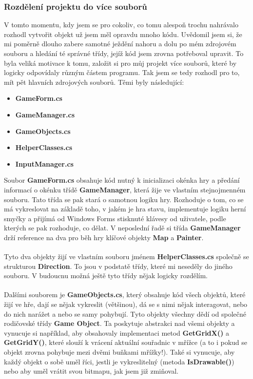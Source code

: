 \documentclass[a4]{article}
\begin{document}
\subsubsection{Rozdělení projektu do více souborů}
V tomto momentu, kdy jsem se pro cokoliv, co tomu alespoň trochu nahrávalo rozhodl vytvořit objekt už jsem měl opravdu mnoho kódu. Uvědomil jsem si, že mi poměrně dlouho zabere samotné ježdění nahoru a dolu po mém zdrojovém souboru a hledání té správné třídy, jejíž kód jsem zrovna potřeboval upravit. To byla veliká motivace k tomu, založit si pro můj projekt více souborů, které by logicky odpovídaly různým částem programu. Tak jsem se tedy rozhodl pro to, mít pět hlavních zdrojových souborů. Těmi byly následující:
\begin{itemize}
    \item \textbf{GameForm.cs}
    \item \textbf{GameManager.cs}
    \item \textbf{GameObjects.cs}
    \item \textbf{HelperClasses.cs}
    \item \textbf{InputManager.cs}
\end{itemize}
Soubor \textbf{GameForm.cs} obsahuje kód nutný k inicializaci okénka hry a předání informací o okénku třídě \textbf{GameManager}, která žije ve vlastním stejnojmenném souboru. Tato třída se pak stará o samotnou logiku hry. Rozhoduje o tom, co se má vykreslovat na základě toho, v jakém je hra stavu, implementuje logiku herní smyčky a přijímá od Windows Forms stisknuté klávesy od uživatele, podle kterých se pak rozhoduje, co dělat. V neposlední řadě si třída \textbf{GameManager} drží reference na dva pro běh hry klíčové objekty \textbf{Map} a \textbf{Painter}.
\\\\
Tyto dva objekty žijí ve vlastním souboru jménem \textbf{HelperClasses.cs} společně se strukturou \textbf{Direction}. To jsou v podstatě třídy, které mi neseděly do jiného souboru. V budoucnu možná ještě tyto třídy nějak logicky rozdělím. 
\\\\
Dalšími souborem je \textbf{GameObjects.cs}, který obsahuje kód všech objektů, které žijí ve hře, dají se nějak vykreslit (většinou), dá se s nimi nějak interagovat, nebo do nich narážet a nebo se samy pohybují. Tyto objekty všechny dědí od společné rodičovské třídy \textbf{Game Object}. Ta poskytuje abstrakci nad všemi objekty a vynucuje si například, aby obsahovaly implementaci metod \textbf{GetGridX()} a \textbf{GetGridY()}, které slouží k vrácení aktuální souřadnic v mřížce (a to i pokud se objekt zrovna pohybuje mezi dvěmi buňkami mřížky!). Také si vynucuje, aby každý objekt o sobě uměl říci, jestli je vykreslitelný (metoda \textbf{IsDrawable()}) nebo aby uměl vrátit svou bitmapu, jak jsem již zmiňoval.
\end{document}
